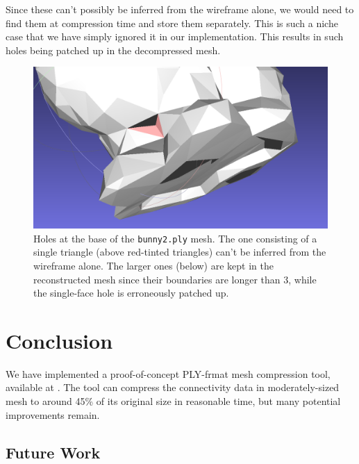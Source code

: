 \documentclass{egpubl}
\begin{document}
Since these can't possibly be inferred from the wireframe alone, we would need to find them at compression time and store them separately.
This is such a niche case that we have simply ignored it in our implementation. This results in such holes being patched up in the decompressed mesh.
\begin{figure}
\centering
\includegraphics[width=.8\linewidth]{figures/bunny2_holes.png}
\caption{Holes at the base of the \texttt{bunny2.ply} mesh. The one consisting of a single triangle (above red-tinted triangles) can't be inferred from the wireframe alone. The larger ones (below) are kept in the reconstructed mesh since their boundaries are longer than 3, while the single-face hole is erroneously patched up.}
\label{fig:bunny_holes}
\end{figure}

\section{Conclusion}

We have implemented a proof-of-concept PLY-frmat mesh compression tool,
available at .
The tool can compress the connectivity data in moderately-sized mesh to around 45\% of its original size in reasonable time, but many potential improvements remain.

\subsection{Future Work}
\end{document}
